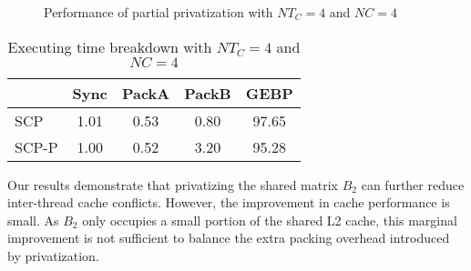 \begin{figure}
  \centering
  \caption{Performance of partial privatization with $NT_C=4$ and $NC=4$}
  \label{fig:privb}
\end{figure}

\begin{table}
  \centering
  \caption{Executing time breakdown with $NT_C=4$ and $NC=4$}
  \label{tab:breakdown}
  \setlength{\tabcolsep}{3.5pt}
  \begin{tabular}{lcccc}
    \toprule
     & Sync & PackA & PackB & GEBP\\
    \midrule
    SCP   & 1.01 & 0.53 & 0.80 & 97.65 \\
    SCP-P & 1.00 & 0.52 & 3.20 & 95.28\\
    \bottomrule
  \end{tabular}
\end{table}


Our results demonstrate that privatizing the shared matrix $B_2$ can further
reduce inter-thread cache conflicts.
However, the improvement in cache performance is small.
As $B_2$ only occupies a small portion of the shared L2 cache,
this marginal improvement is not sufficient to
balance the extra packing overhead introduced
by privatization.

